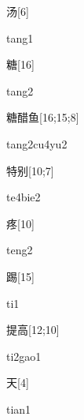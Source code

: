 \begin{verbete}[tang1]{汤}[6]
\begin{pronuncia}{tang1}
\end{pronuncia}
\end{verbete}

\begin{verbete}[tang2]{糖}[16]
\begin{pronuncia}{tang2}
\end{pronuncia}
\end{verbete}

\begin{verbete}[tang2cu4yu2]{糖醋鱼}[16;15;8]
\begin{pronuncia}{tang2cu4yu2}
\end{pronuncia}
\end{verbete}

\begin{verbete}[te4bie2]{特别}[10;7]
\begin{pronuncia}{te4bie2}
\end{pronuncia}
\end{verbete}

\begin{verbete}[teng2]{疼}[10]
\begin{pronuncia}{teng2}
\end{pronuncia}
\end{verbete}

\begin{verbete}[ti1]{踢}[15]
\begin{pronuncia}{ti1}
\end{pronuncia}
\end{verbete}

\begin{verbete}[ti2gao1]{提高}[12;10]
\begin{pronuncia}{ti2gao1}
\end{pronuncia}
\end{verbete}

\begin{verbete}[tian1]{天}[4]
\begin{pronuncia}{tian1}
\end{pronuncia}
\end{verbete}

